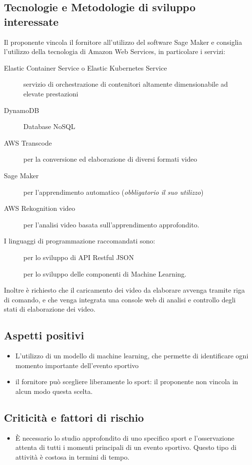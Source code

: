 \documentclass[../studio-di-fattibilita.tex]{subfiles}
\begin{document}
\subsection{Tecnologie e Metodologie di sviluppo interessate}%
\label{subsec:tecnologie_interessate}
Il proponente vincola il fornitore all'utilizzo del software Sage Maker e consiglia l'utilizzo della tecnologia di Amazon Web Services, in particolare i servizi:
\begin{description}
  \item[Elastic Container Service o Elastic Kubernetes Service] servizio di orchestrazione di contenitori altamente dimensionabile ad elevate prestazioni
  \item[DynamoDB] Database NoSQL
  \item[AWS Transcode] per la conversione ed elaborazione di diversi formati video
  \item[Sage Maker] per l'apprendimento automatico (\textit{obbligatorio il suo utilizzo})
  \item[AWS Rekognition video] per l'analisi video basata sull'apprendimento approfondito.
\end{description}
I linguaggi di programmazione raccomandati sono:
\begin{description}
  \item[] per lo sviluppo di API Restful JSON
  \item[] per lo sviluppo delle componenti di Machine Learning.
\end{description}
Inoltre è richiesto che il caricamento dei video da elaborare avvenga tramite riga di comando, e che venga integrata una console web di analisi e controllo degli stati di elaborazione dei video.


\subsection{Aspetti positivi}%
\label{subsec:aspetti_positivi}
\begin{itemize}
  \item L'utilizzo di un modello di machine learning, che permette di identificare ogni momento importante dell’evento sportivo
  \item il fornitore può scegliere liberamente lo sport: il proponente non vincola in alcun modo questa scelta.
\end{itemize}


\subsection{Criticità e fattori di rischio}%
\label{sec:criticita_e_fattori_di_rischio}
\begin{itemize}
  \item È necessario lo studio approfondito di uno specifico sport e l'osservazione attenta di tutti i momenti principali di un evento sportivo. Questo tipo di attività è costosa in termini di tempo.
\end{itemize}
\end{document}
